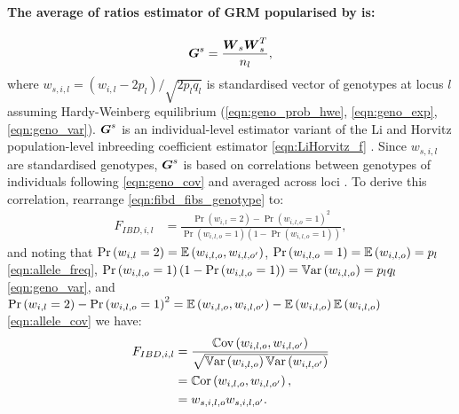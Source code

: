 \paragraph{The average of ratios estimator of GRM popularised by
\cite{yang2010common} is:}
%
\begin{equation} \label{eqn:G_s}
  \boldsymbol{G}^{s} = \frac{\boldsymbol{W}_s \boldsymbol{W}_s^T}{n_l},
\end{equation}
%
where $w_{s,i,l} = \left(w_{i,l} - 2 p_l\right) / \sqrt{2 p_l q_l}$
is standardised vector of genotypes at locus $l$ assuming Hardy-Weinberg
equilibrium (\ref{eqn:geno_prob_hwe}, \ref{eqn:geno_exp}, \ref{eqn:geno_var}).
%
$\boldsymbol{G}^{s}$ is an individual-level estimator variant of the
Li and Horvitz population-level inbreeding coefficient estimator
\eqref{eqn:LiHorvitz_f}
\citep{li1953some, ritland1996estimators, astle2009population}.
%
Since $w_{s,i,l}$ are standardised genotypes, $\boldsymbol{G}^{s}$ is based on
correlations between genotypes of individuals following \eqref{eqn:geno_cov}
and averaged across loci \cite{astle2009population, speed2015relatedness}.
%
To derive this correlation, rearrange \eqref{eqn:fibd_fibs_genotype} to:
%
%
\begin{align} \label{eqn:fibd_as_cor_probs}
  F_{IBD,i,l} & = \frac{\Pr\left(w_{i,l} = 2\right) - \Pr\left(w_{i,l,o} = 1\right)^2}
                       {\Pr\left(w_{i,l,o} = 1\right) \left(1 - \Pr\left(w_{i,l,o} = 1\right)\right)},
\end{align}
%
and noting that
$\Pr\left(w_{i,l} = 2\right) = \mathbb{E}\left(w_{i,l,o},w_{i,l,o'}\right)$,
$\Pr\left(w_{i,l,o} = 1\right) = \mathbb{E}\left(w_{i,l,o}\right) = p_l$ \eqref{eqn:allele_freq},
$\Pr\left(w_{i,l,o} = 1\right) (1 - \Pr\left(w_{i,l,o} = 1\right))
  = \mathbb{V}\text{ar}\left(w_{i,l,o}\right) = p_l q_l$ \eqref{eqn:geno_var},
and
$\Pr\left(w_{i,l} = 2\right) - \Pr\left(w_{i,l,o} = 1\right)^2 
  = \mathbb{E}\left(w_{i,l,o},w_{i,l,o'}\right) - \mathbb{E}\left(w_{i,l,o}\right)\mathbb{E}\left(w_{i,l,o}\right)$  \eqref{eqn:allele_cov}
%
we have:
%
\begin{align} \label{eqn:fibd_as_cor}
  F_{IBD,i,l} & = \frac{\mathbb{C}\text{ov}\left(w_{i,l,o}, w_{i,l,o'}\right)}
                       {\sqrt{\mathbb{V}\text{ar}\left(w_{i,l,o}\right) \mathbb{V}\text{ar}\left(w_{i,l,o'}\right)}}\\
              & = \mathbb{C}\text{or}\left(w_{i,l,o}, w_{i,l,o'}\right), \notag \\
              & = w_{s,i,l,o} w_{s,i,l,o'}. \notag
\end{align}
